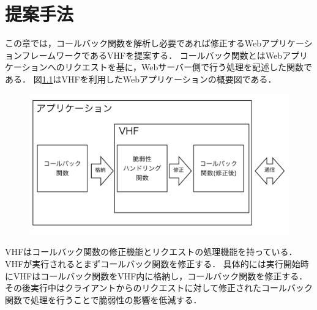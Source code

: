 \documentclass[a4paper,12pt]{jreport}
\begin{document}
\chapter{提案手法}
この章では，コールバック関数を解析し必要であれば修正するWebアプリケーションフレームワークであるVHFを提案する．
コールバック関数とはWebアプリケーションへのリクエストを基に，Webサーバー側で行う処理を記述した関数である．
図\ref{fig:vhf}はVHFを利用したWebアプリケーションの概要図である．
\begin{figure}[ht]
  \begin{center}
    \includegraphics[clip, width=130mm]{./figures/vhf.png}
    \label{fig:vhf}
  \end{center}
\end{figure}
VHFはコールバック関数の修正機能とリクエストの処理機能を持っている．
VHFが実行されるとまずコールバック関数を修正する．
具体的には実行開始時にVHFはコールバック関数をVHF内に格納し，コールバック関数を修正する．
その後実行中はクライアントからのリクエストに対して修正されたコールバック関数で処理を行うことで脆弱性の影響を低減する．
\end{document}
